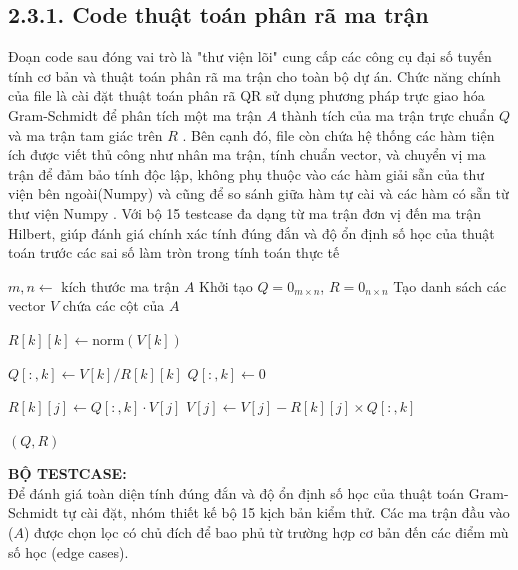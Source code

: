 \subsection*{2.3.1. Code thuật toán phân rã ma trận}
{}
Đoạn code sau đóng vai trò là "thư viện lõi" cung cấp các công cụ đại số tuyến tính cơ bản và thuật toán phân rã ma trận cho toàn bộ dự án. Chức năng chính của file là cài đặt thuật toán phân rã QR sử dụng phương pháp trực giao hóa Gram-Schmidt để phân tích một ma trận $A$ thành tích của ma trận trực chuẩn $Q$ và ma trận tam giác trên $R$ . Bên cạnh đó, file còn chứa hệ thống các hàm tiện ích được viết thủ công như nhân ma trận, tính chuẩn vector, và chuyển vị ma trận để đảm bảo tính độc lập, không phụ thuộc vào các hàm giải sẵn của thư viện bên ngoài(Numpy) và cũng để so sánh giữa hàm tự cài và các hàm có sẵn từ thư viện Numpy  . Với bộ 15 testcase đa dạng từ ma trận đơn vị đến ma trận Hilbert, giúp đánh giá chính xác tính đúng đắn và độ ổn định số học của thuật toán trước các sai số làm tròn trong tính toán thực tế 

\begin{algorithm}[H]
\caption{Phân Rã QR - Gram-Schmidt Cải Tiến (Modified Gram-Schmidt)}
\label{alg:qr_decomposition}
\begin{algorithmic}[1]
    \State $m, n \gets$ kích thước ma trận $A$
    \State Khởi tạo $Q = 0_{m \times n}$, $R = 0_{n \times n}$
    \State Tạo danh sách các vector $V$ chứa các cột của $A$
    
        \State $R[k][k] \gets \text{norm}(V[k])$ 
        
            \State $Q[:, k] \gets V[k] / R[k][k]$ 
        \Else
            \State $Q[:, k] \gets 0$
        \EndIf
        
            \State $R[k][j] \gets Q[:, k] \cdot V[j]$ 
            \State $V[j] \gets V[j] - R[k][j] \times Q[:, k]$ 
        \EndFor
    \EndFor
    
    \State \Return $(Q, R)$
\EndProcedure
\end{algorithmic}
\end{algorithm}

\textbf{BỘ TESTCASE:} \\
Để đánh giá toàn diện tính đúng đắn và độ ổn định số học của thuật toán Gram-Schmidt tự cài đặt, nhóm thiết kế bộ 15 kịch bản kiểm thử. Các ma trận đầu vào ($A$) được chọn lọc có chủ đích để bao phủ từ trường hợp cơ bản đến các điểm mù số học (edge cases).

